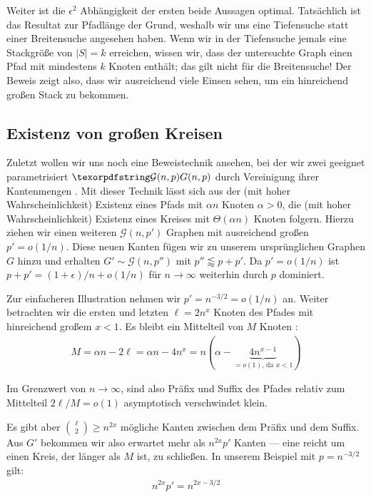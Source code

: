 Weiter ist die $\epsilon^2$ Abhängigkeit der ersten beide Aussagen optimal.
Tatsächlich ist das Resultat zur Pfadlänge der Grund, weshalb wir uns eine Tiefensuche statt einer Breitensuche angesehen haben.
Wenn wir in der Tiefensuche jemals eine Stackgröße von $|S| = k$ erreichen, wissen wir, dass der untersuchte Graph einen Pfad mit mindestens $k$ Knoten enthält;
das gilt nicht für die Breitensuche!
Der Beweis zeigt also, dass wir ausreichend viele Einsen sehen, um ein hinreichend großen Stack zu bekommen.

\subsection{Existenz von großen Kreisen}
Zuletzt wollen wir uns noch eine Beweistechnik ansehen, bei der wir zwei geeignet parametrisiert $\Gnp$ durch Vereinigung ihrer Kantenmengen .
Mit dieser Technik lässt sich aus der (mit hoher Wahrscheinlichkeit) Existenz eines Pfads mit $\alpha n$ Knoten $\alpha > 0$, die (mit hoher Wahrscheinlichkeit) Existenz eines Kreises mit $\Theta(\alpha n)$ Knoten folgern.
Hierzu ziehen wir einen weiteren $\mathcal G(n, p')$ Graphen mit ausreichend großen $p' = o(1/n)$.
Diese neuen Kanten fügen wir zu unserem ursprünglichen Graphen $G$ hinzu und erhalten $G' \sim \mathcal G(n, p'')$ mit $p'' \lessapprox p + p'$.
Da $p' = o(1/n)$ ist $p + p' = (1+\epsilon)/n + o(1/n)$ für $n \to \infty$ weiterhin durch $p$ dominiert.

Zur einfacheren Illustration nehmen wir $p' = n^{-3/2} = o(1/n)$ an.
Weiter betrachten wir die ersten und letzten $\ell = 2 n^x$ Knoten des Pfades mit hinreichend großem $x < 1$.
Es bleibt ein Mittelteil von $M$ Knoten :
\begin{align}
    M = \alpha n - 2\ell =\alpha n - 4 n^x =  n(\alpha - \underbrace{4n^{x - 1}}_{=o(1)\text{, da } x < 1})
\end{align}

Im Grenzwert von $n\to\infty$, sind also Präfix und Suffix des Pfades relativ zum Mittelteil $2\ell / M = o(1)$ asymptotisch verschwindet klein.

Es gibt aber $\binom{\ell}{2} \ge n^{2x}$ mögliche Kanten zwischen dem Präfix und dem Suffix.
Aus $G'$ bekommen wir also erwartet mehr als $n^{2x} p'$ Kanten --- eine reicht um einen Kreis, der länger als $M$ ist, zu schließen.
In unserem Beispiel mit $p = n^{-3/2}$ gilt:
\begin{align}
    n^{2x} p' = n^{2x - 3/2}
\end{align}

